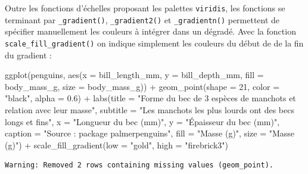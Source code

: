 \documentclass[
  letterpaper,
  DIV=11,
  numbers=noendperiod]{scrreprt}
\newenvironment{Shaded}{\begin{snugshade}}{\end{snugshade}}
\newcommand{\AttributeTok}[1]{\textcolor[rgb]{0.40,0.45,0.13}{#1}}
\newcommand{\DecValTok}[1]{\textcolor[rgb]{0.68,0.00,0.00}{#1}}
\newcommand{\FloatTok}[1]{\textcolor[rgb]{0.68,0.00,0.00}{#1}}
\newcommand{\FunctionTok}[1]{\textcolor[rgb]{0.28,0.35,0.67}{#1}}
\newcommand{\NormalTok}[1]{\textcolor[rgb]{0.00,0.23,0.31}{#1}}
\newcommand{\SpecialCharTok}[1]{\textcolor[rgb]{0.37,0.37,0.37}{#1}}
\newcommand{\StringTok}[1]{\textcolor[rgb]{0.13,0.47,0.30}{#1}}
\begin{document}
Outre les fonctions d'échelles proposant les palettes \texttt{viridis},
les fonctions se terminant par \texttt{\_gradient()},
\texttt{\_gradient2()} et \texttt{\_gradientn()} permettent de spécifier
manuellement les couleurs à intégrer dans un dégradé. Avec la fonction
\texttt{scale\_fill\_gradient()} on indique simplement les couleurs du
début de de la fin du gradient :

\begin{Shaded}
\begin{Highlighting}[]
\FunctionTok{ggplot}\NormalTok{(penguins, }\FunctionTok{aes}\NormalTok{(}\AttributeTok{x =}\NormalTok{ bill\_length\_mm, }\AttributeTok{y =}\NormalTok{ bill\_depth\_mm,}
                     \AttributeTok{fill =}\NormalTok{ body\_mass\_g, }\AttributeTok{size =}\NormalTok{ body\_mass\_g)) }\SpecialCharTok{+}
  \FunctionTok{geom\_point}\NormalTok{(}\AttributeTok{shape =} \DecValTok{21}\NormalTok{, }\AttributeTok{color =} \StringTok{"black"}\NormalTok{, }\AttributeTok{alpha =} \FloatTok{0.6}\NormalTok{) }\SpecialCharTok{+}
  \FunctionTok{labs}\NormalTok{(}\AttributeTok{title =} \StringTok{"Forme du bec de 3 espèces de manchots et relation avec leur masse"}\NormalTok{,}
       \AttributeTok{subtitle =} \StringTok{"Les manchots les plus lourds ont des becs longs et fins"}\NormalTok{,}
       \AttributeTok{x =} \StringTok{"Longueur du bec (mm)"}\NormalTok{,}
       \AttributeTok{y =} \StringTok{"Épaisseur du bec (mm)"}\NormalTok{,}
       \AttributeTok{caption =} \StringTok{"Source :  package \textquotesingle{}palmerpenguins\textquotesingle{}"}\NormalTok{,}
       \AttributeTok{fill =} \StringTok{"Masse (g)"}\NormalTok{,}
       \AttributeTok{size =} \StringTok{"Masse (g)"}\NormalTok{) }\SpecialCharTok{+}
  \FunctionTok{scale\_fill\_gradient}\NormalTok{(}\AttributeTok{low =} \StringTok{"gold"}\NormalTok{, }\AttributeTok{high =} \StringTok{"firebrick3"}\NormalTok{)}
\end{Highlighting}
\end{Shaded}

\begin{verbatim}
Warning: Removed 2 rows containing missing values (geom_point).
\end{verbatim}
\end{document}
